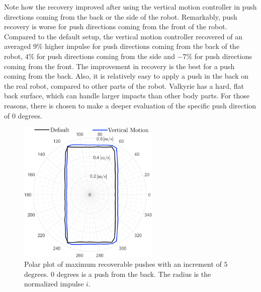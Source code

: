 Note how the recovery improved after using the vertical motion controller in push directions coming from the back or the side of the robot. Remarkably, push recovery is worse for push directions coming from the front of the robot. Compared to the default setup, the vertical motion controller recovered of an averaged $9$\% higher impulse for push directions coming from the back of the robot, $4$\% for push directions coming from the side and $-7$\% for push directions coming from the front. The improvement in recovery is the best for a push coming from the back. Also, it is relatively easy to apply a push in the back on the real robot, compared to other parts of the robot. Valkyrie has a hard, flat back surface, which can handle larger impacts than other body parts. For those reasons, there is chosen to make a deeper evaluation of the specific push direction of $0$ degrees.
\begin{figure}
\centering
\includegraphics[width=0.6\textwidth]{STYLESTUFF/roundStanding.png}
\caption{Polar plot of maximum recoverable pushes with an increment of $5$ degrees. $0$ degrees is a push from the back. The radius is the normalized impulse $i$. }
\label{fig:roundStanding}
\end{figure}

